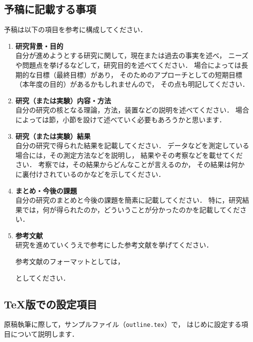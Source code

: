 \documentclass[twoside,twocolumn]{ujarticle}
\begin{document}
\subsection{予稿に記載する事項}
%
予稿は以下の項目を参考に構成してください．
%
\begin{enumerate}
  \item \textbf{研究背景・目的} \\
    自分が進めようとする研究に関して，現在または過去の事実を述べ，
    ニーズや問題点を挙げるなどして，研究目的を述べてください．
    場合によっては長期的な目標（最終目標）があり，
    そのためのアプローチとしての短期目標（本年度の目的）があるかもしれませんので，
    その点も明記してください．
  \item \textbf{研究（または実験）内容・方法} \\
    自分の研究の核となる理論，方法，装置などの説明を述べてください．
    場合によっては節，小節を設けて述べていく必要もあろうかと思います．
  \item \textbf{研究（または実験）結果} \\
    自分の研究で得られた結果を記載してください．
    データなどを測定している場合には，その測定方法などを説明し，
    結果やその考察などを載せてください．
    考察では，その結果からどんなことが言えるのか，
    その結果は何かに裏付けされているのかなどを示してください．
  \item \textbf{まとめ・今後の課題} \\
    自分の研究のまとめと今後の課題を簡素に記載してください．
    特に，研究結果では，何が得られたのか，どういうことが分かったのかを記載してください．
  \item \textbf{参考文献} \\
    研究を進めていくうえで参考にした参考文献を挙げてください．
    
    参考文献のフォーマットとしては，
    \renewcommand{\labelenumii}{[\arabic{enumii}]}
    \renewcommand{\labelenumii}{\arabic{enumii}}
    としてください．
\end{enumerate}
%
%
\subsection{\TeX 版での設定項目}
%
原稿執筆に際して，サンプルファイル（\texttt{outline.tex}）で，
はじめに設定する項目について説明します．
\end{document}
